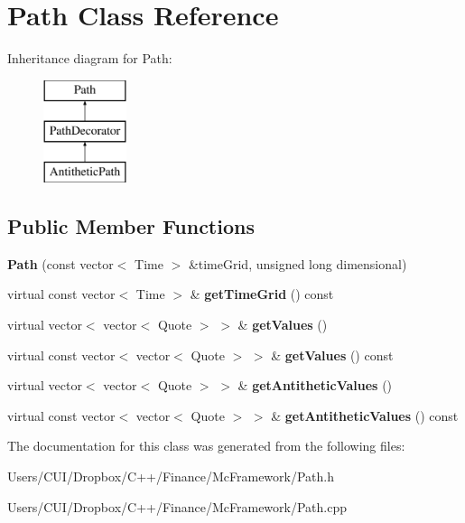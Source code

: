 \hypertarget{class_path}{}\section{Path Class Reference}
\label{class_path}
Inheritance diagram for Path\+:\begin{figure}[H]
\begin{center}
\leavevmode
\includegraphics[height=3.000000cm]{class_path}
\end{center}
\end{figure}
\subsection*{Public Member Functions}
\begin{DoxyCompactItemize}
\item 
\hypertarget{class_path_a589f506da73b9b80f21a27102656b2ba}{}\label{class_path_a589f506da73b9b80f21a27102656b2ba} 
{\bfseries Path} (const vector$<$ Time $>$ \&time\+Grid, unsigned long dimensional)
\item 
\hypertarget{class_path_a774bc2169ae87142b8165c3934a9deb9}{}\label{class_path_a774bc2169ae87142b8165c3934a9deb9} 
virtual const vector$<$ Time $>$ \& {\bfseries get\+Time\+Grid} () const
\item 
\hypertarget{class_path_aeeb21dd5019a717cc8a36ddb0f82f427}{}\label{class_path_aeeb21dd5019a717cc8a36ddb0f82f427} 
virtual vector$<$ vector$<$ Quote $>$ $>$ \& {\bfseries get\+Values} ()
\item 
\hypertarget{class_path_a6d3469e98b5da124b51ca8a9cc2caa28}{}\label{class_path_a6d3469e98b5da124b51ca8a9cc2caa28} 
virtual const vector$<$ vector$<$ Quote $>$ $>$ \& {\bfseries get\+Values} () const
\item 
\hypertarget{class_path_ae6097f4761ac45d2d3656c35f09563f0}{}\label{class_path_ae6097f4761ac45d2d3656c35f09563f0} 
virtual vector$<$ vector$<$ Quote $>$ $>$ \& {\bfseries get\+Antithetic\+Values} ()
\item 
\hypertarget{class_path_aadadd7f7ad38c779e36f3ef2805f30e9}{}\label{class_path_aadadd7f7ad38c779e36f3ef2805f30e9} 
virtual const vector$<$ vector$<$ Quote $>$ $>$ \& {\bfseries get\+Antithetic\+Values} () const
\end{DoxyCompactItemize}


The documentation for this class was generated from the following files\+:\begin{DoxyCompactItemize}
\item 
Users/\+C\+U\+I/\+Dropbox/\+C++/\+Finance/\+Mc\+Framework/Path.\+h\item 
Users/\+C\+U\+I/\+Dropbox/\+C++/\+Finance/\+Mc\+Framework/Path.\+cpp\end{DoxyCompactItemize}
